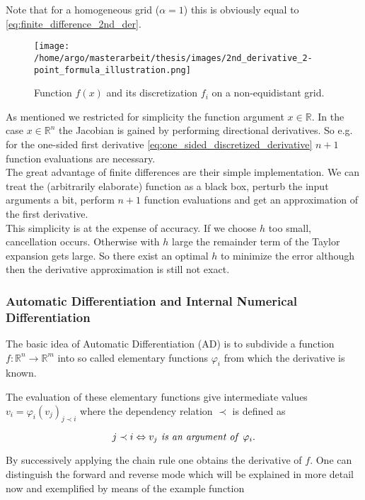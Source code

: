 \documentclass{scrartcl}[12pt, halfparskip]
\numberwithin{equation}{section}
\numberwithin{figure}{section}
\numberwithin{table}{section}
\begin{document}
Note that for a homogeneous grid ($\alpha=1$) this is obviously equal to \cref{eq:finite_difference_2nd_der}. \\

\begin{figure}[H]
	\centering
	\texttt{[image: /home/argo/masterarbeit/thesis/images/2nd\_derivative\_2-point\_formula\_illustration.png]}
	\caption{Function $f(x)$ and its discretization $f_i$ on a non-equidistant grid.}
	\label{fig:2_point_formula_illustration}
\end{figure}


As mentioned we restricted for simplicity the function argument $x \in \mathbb{R}$. In the case $x \in \mathbb{R}^n$ the Jacobian is gained by performing directional derivatives. So e.g. for the one-sided first derivative \cref{eq:one_sided_discretized_derivative} $n+1$ function evaluations are necessary. \\

The great advantage of finite differences are their simple implementation. We can treat the (arbitrarily elaborate) function as a black box, perturb the input arguments a bit, perform $n+1$ function evaluations and get an approximation of the first derivative. \\
This simplicity is at the expense of accuracy. If we choose $h$ too small, cancellation occurs. Otherwise with $h$ large the remainder term of the Taylor expansion gets large. So there exist an optimal $h$ to minimize the error although then the derivative approximation is still not exact.




\subsubsection{Automatic Differentiation and Internal Numerical Differentiation}
The basic idea of Automatic Differentiation (AD) is to subdivide a function ${f: \mathbb{R}^n \rightarrow \mathbb{R}^m}$ into so called elementary functions $\varphi_i$ from which the derivative is known. 

The evaluation of these elementary functions give intermediate values $v_i = \varphi_i(v_j)_{j \prec i}$ where the dependency relation $\prec$ is defined as

\begin{equation}
j \prec i \Leftrightarrow v_j \text{\textit{ is an argument of }} \varphi_i.
\end{equation}

By successively applying the chain rule one obtains the derivative of $f$.
One can distinguish the forward and reverse mode which will be explained in more detail now and exemplified by means of the example function
\end{document}
